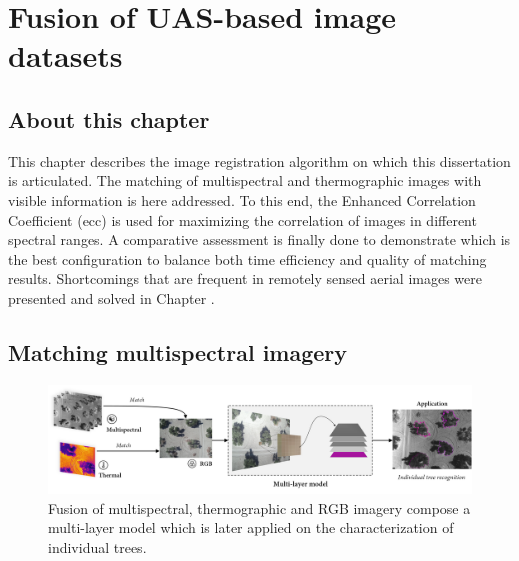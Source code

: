 \setchapterpreamble[u]{\margintoc}
\chapter{Fusion of UAS-based image datasets}
\label{sec:image_fusion}

\section*{About this chapter}

This chapter describes the image registration algorithm on which this dissertation is articulated. The matching of multispectral and thermographic images with visible information is here addressed. To this end, the Enhanced Correlation Coefficient (\acrshort{ecc}) is used for maximizing the correlation of images in different spectral ranges. A comparative assessment is finally done to demonstrate which is the best configuration to balance both time efficiency and quality of matching results. Shortcomings that are frequent in remotely sensed aerial images were presented and solved in Chapter . 

\section{Matching multispectral imagery}

\begin{figure}
    \includegraphics[width=\linewidth]{figs/image_fusion/summary_image_fusion.png}\hspace*{\fill}
    \caption{Fusion of multispectral, thermographic and RGB imagery compose a multi-layer model which is later applied on the characterization of individual trees.}
	\label{fig:image_fusion_framework}
\end{figure}

